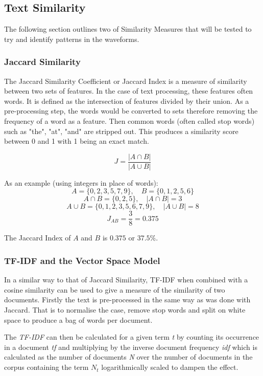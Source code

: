 \documentclass[../report.tex]{subfiles}
\begin{document}
\subsection{Text Similarity}

	The following section outlines two of Similarity Measures that will be tested to try and identify patterns in the waveforms.

\subsubsection{Jaccard Similarity} \label{sec:bkg-jaccard}

	The Jaccard Similarity Coefficient or Jaccard Index is a measure of similarity between two sets of features.  In the case of text processing, these features often words.  It is defined as the intersection of features divided by their union.  As a pre-processing step, the words would be converted to sets therefore removing the frequency of a word as a feature.  Then common words (often called stop words) such as "the", "at", "and" are stripped out.  This produces a similarity score between 0 and 1 with 1 being an exact match.
	
	$$
	J = \frac{|A \cap B|}{|A \cup B|}
	$$

\begin{minipage}{\linewidth}
	As an example (using integers in place of words):
	$$ A = \{0, 2, 3, 5, 7, 9\},\quad B = \{0, 1, 2, 5, 6\} $$
	$$ A\cap B = \{0, 2, 5\},\quad |A\cap B| = 3 $$
	$$ A\cup B = \{0, 1, 2, 3, 5, 6, 7, 9\},\quad |A\cup B| = 8	$$
	$$ J_{AB} = \frac{3}{8} = 0.375 $$
\end{minipage}

	The Jaccard Index of $A$ and $B$ is $0.375$ or $37.5\%$.

\subsubsection{TF-IDF and the Vector Space Model}
	
	In a similar way to that of Jaccard Similarity, TF-IDF when combined with a cosine similarity can be used to give a measure of the similarity of two documents.  Firstly the text is pre-processed in the same way as was done with Jaccard.  That is to normalise the case, remove stop words and split on white space to produce a bag of words per document.
	
	The \textit{TF-IDF} can then be calculated for a given term \textit{t} by counting its occurrence in a document \textit{tf} and multiplying by the inverse document frequency \textit{idf} which is calculated as the number of documents \textit{N} over the number of documents in the corpus containing the term \textit{$N_{t}$} logarithmically scaled to dampen the effect.
	
\end{document}
